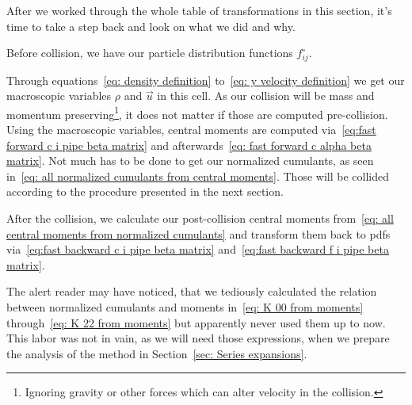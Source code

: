 
After we worked through the whole table of transformations in this section, it's time to take a step back and look on what we did and why.

Before collision, we have our particle distribution functions $f_{ij}^{\circ}$.

Through equations~\eqref{eq: density definition} to~\eqref{eq: y velocity definition} we get our macroscopic variables $\rho$ and $\vec{u}$ in this cell.
As our collision will be mass and momentum preserving\footnote{Ignoring gravity or other forces which can alter velocity in the collision.}, it does not matter if those are computed pre-collision.
Using the macroscopic variables, central moments are computed via~\eqref{eq:fast forward c i pipe beta matrix} and afterwards~\eqref{eq: fast forward c alpha beta matrix}.
Not much has to be done to get our normalized cumulants, as seen in~\eqref{eq: all normalized cumulants from central moments}.
Those will be collided according to the procedure presented in the next section.

After the collision, we calculate our post-collision central moments from~\eqref{eq: all central moments from normalized cumulants}
and transform them back to \glspl{pdf} via~\eqref{eq:fast backward c i pipe beta matrix} and~\eqref{eq:fast backward f i pipe beta matrix}.

The alert reader may have noticed, that we tediously calculated the relation between normalized cumulants and moments in~\eqref{eq: K 00 from moments} through~\eqref{eq: K 22 from moments} but apparently never used them up to now.
This labor was not in vain, as we will need those expressions, when we prepare the analysis of the method in Section~\ref{sec: Series expansions}.
